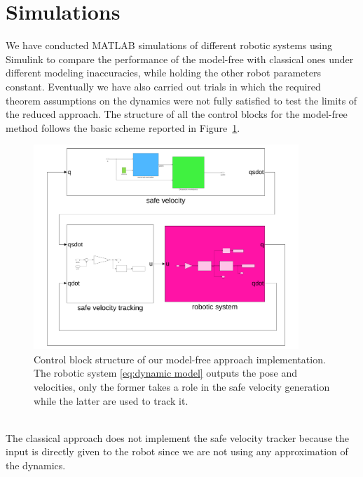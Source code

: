 \section{Simulations}\label{sec:simulation}
We have conducted MATLAB simulations of different robotic systems using Simulink to compare the performance of the model-free with classical ones under different modeling inaccuracies, while holding the other robot parameters constant. Eventually we have also carried out trials in which the required theorem assumptions on the dynamics were not fully satisfied to test the limits of the reduced approach. The structure of all the control blocks for the model-free method follows the basic scheme reported in Figure~\ref{fig:simulink}.
\begin{figure}[h]
    \centering
    \includegraphics[width=10cm]{../figures/schema.pdf}
    \caption{Control block structure of our model-free approach implementation. The robotic system \eqref{eq:dynamic model} outputs the pose and velocities, only the former takes a role in the safe velocity generation while the latter are used to track it.}
    \label{fig:simulink}
\end{figure}
\\
The classical approach does not implement the safe velocity tracker because the input is directly given to the robot since we are not using any approximation of the dynamics.

